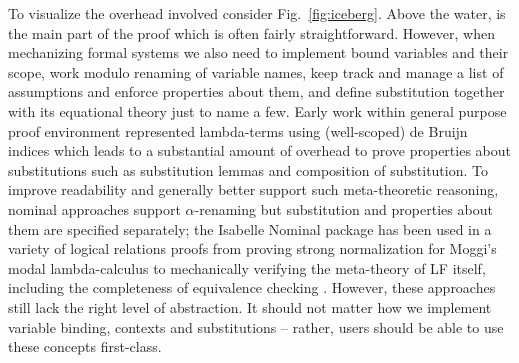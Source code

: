 To visualize the overhead involved consider Fig.~\ref{fig:iceberg}. Above the water, is the main part of the proof which is often fairly straightforward. However, when mechanizing formal systems we also need to implement bound variables and their scope, work modulo renaming of variable names, keep track and manage a list of assumptions and enforce properties about them, and define substitution together with its equational theory just to name a few. Early work \citep{Berardi:WLF90,CCoquand:92,Altenkirch:TLCA93}  within general purpose proof environment represented lambda-terms using (well-scoped) de Bruijn indices which leads to a substantial amount of overhead to prove properties about substitutions such as substitution lemmas and composition of substitution.
To improve readability and generally better support such meta-theoretic reasoning, nominal approaches support $\alpha$-renaming but substitution and properties about them are specified separately; the Isabelle Nominal package \citep{Urban:JAR08} has been used in a variety of logical relations proofs from proving strong normalization for Moggi's modal lambda-calculus \citep{Doczkal:LFMTP09} to mechanically verifying the meta-theory of LF itself, including the completeness of equivalence checking \citep{Narboux:LFMTP08,Urban:TOCL11}.  However,  these approaches still lack the right level of abstraction. It should not matter how we implement variable binding, contexts and substitutions -- rather, users should be able to use these concepts first-class.

